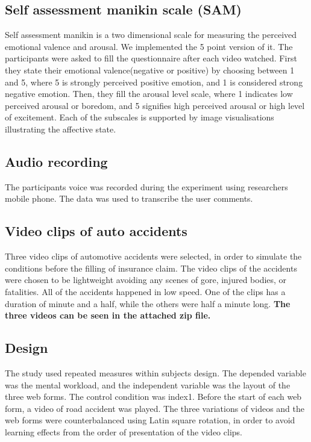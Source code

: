\documentclass[../main/Feedback.tex]{subfiles}
\begin{document}
\subsection{Self assessment manikin scale (SAM)}
Self assessment manikin\cite{bradley1994measuring} is a two dimensional scale for measuring the perceived emotional valence and arousal. We implemented the 5 point version of it. The participants were asked to fill the questionnaire after each video watched. First they state their emotional valence(negative or positive) by choosing between 1 and 5, where 5 is strongly perceived positive emotion, and 1 is considered strong negative emotion. Then, they fill the arousal level scale, where 1 indicates low perceived arousal or boredom, and 5 signifies high perceived arousal or high level of excitement. Each of the subscales is supported by image visualisations illustrating the affective state.

\subsection{Audio recording}
The participants voice was recorded during the experiment using researchers mobile phone. The data was used to transcribe the user comments.

\subsection{Video clips of auto accidents}
Three video clips of automotive accidents were selected, in order to simulate the conditions before the filling of insurance claim. The video clips of the accidents were chosen to be lightweight avoiding any scenes of gore, injured bodies, or fatalities. All of the accidents happened in low speed. One of the clips has a duration of minute and a half, while the others were half a minute long. \textbf{The three videos can be seen in the attached zip file.}

\subsection{Design}
The study used repeated measures within subjects design. The depended variable was the mental workload, and the independent variable was the layout of the three web forms. The control condition was index1. Before the start of each web form, a video of road accident was played. The three variations of videos and the web forms were counterbalanced using Latin square rotation, in order to avoid learning effects from the order of presentation of the video clips.
\end{document}
